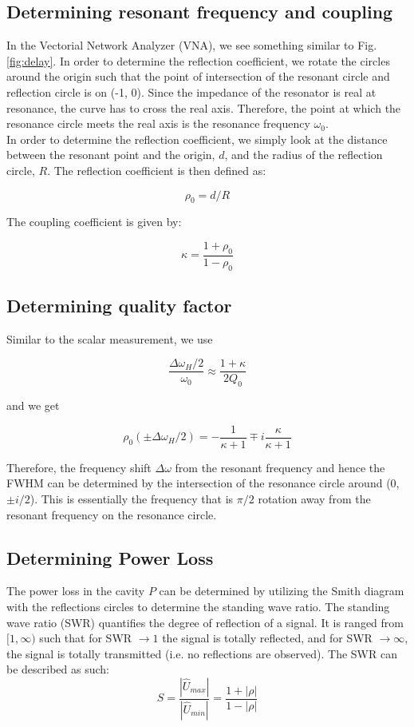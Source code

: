 \documentclass[a4paper]{report}
\numberwithin{equation}{section}
\begin{document}
\subsection{Determining resonant frequency and coupling}
In the Vectorial Network Analyzer (VNA), we see something similar to Fig. \ref{fig:delay}. In order to determine the reflection coefficient, we rotate the circles around the origin such that the point of intersection of the resonant circle and reflection circle is on (-1, 0). Since the impedance of the resonator is real at resonance, the curve has to cross the real axis. Therefore, the point at which the resonance circle meets the real axis is the resonance frequency $\omega_{0}$. \\
In order to determine the reflection coefficient, we simply look at the distance between the resonant point and the origin, $d$, and the radius of the reflection circle, $R$. The reflection coefficient is then defined as: 

\[
		\rho_{0} = d/ R
\]

The coupling coefficient is given by: 

\[
		\kappa = \frac{1 + \rho_{0}}{1 - \rho_{0}}
\]


\subsection{Determining quality factor}
Similar to the scalar measurement, we use

\[
		\frac{\Delta \omega_{H}/2}{\omega_{0}} \approx \frac{1 + \kappa}{2Q_{0}}	
\]

and we get 

\[
		\rho_{0}(\pm \Delta \omega_{H}/2) = -\frac{1}{\kappa + 1} \mp i\frac{\kappa}{\kappa + 1}
\]

Therefore, the frequency shift $\Delta \omega$ from the resonant frequency and hence the FWHM can be determined by the intersection of the resonance circle around (0, $\pm i/2$).
This is essentially the frequency that is $\pi / 2$ rotation away from the resonant frequency on the resonance circle. 

\subsection{Determining Power Loss}

The power loss in the cavity $P$ can be determined by utilizing the Smith diagram with the reflections circles to 
determine the standing wave ratio. The standing wave ratio (SWR) quantifies the degree of reflection of a signal. It is ranged
from $[1, \infty)$ such that for SWR $\rightarrow 1$ the signal is totally reflected, and for
SWR $\rightarrow \infty$, the signal is totally transmitted (i.e. no reflections are observed). The SWR can be
described as such: 
\begin{equation}
	S = \frac{|\hat{U}_{max}|}{|\hat{U}_{min}|} = \frac{1 + |\rho|}{1 - |\rho|}
\end{equation}
\end{document}
